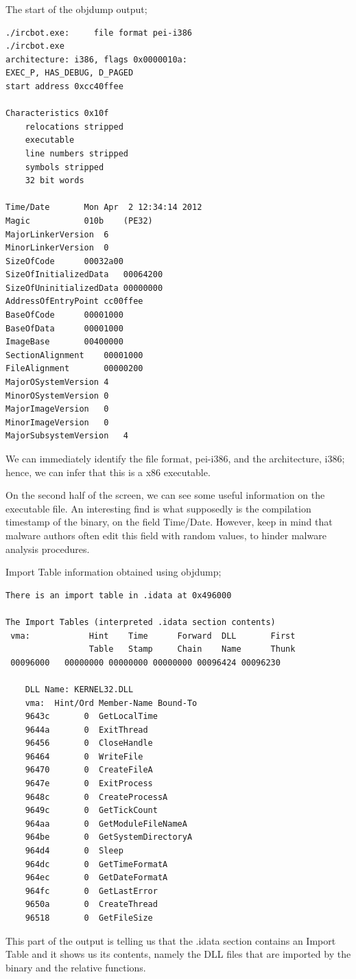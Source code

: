 \documentclass[]{project_plan}
\begin{document}
The start of the objdump output;
\begin{lstlisting}[basicstyle=\tiny]
./ircbot.exe:     file format pei-i386
./ircbot.exe
architecture: i386, flags 0x0000010a:
EXEC_P, HAS_DEBUG, D_PAGED
start address 0xcc40ffee

Characteristics 0x10f
	relocations stripped
	executable
	line numbers stripped
	symbols stripped
	32 bit words

Time/Date		Mon Apr  2 12:34:14 2012
Magic			010b	(PE32)
MajorLinkerVersion	6
MinorLinkerVersion	0
SizeOfCode		00032a00
SizeOfInitializedData	00064200
SizeOfUninitializedData	00000000
AddressOfEntryPoint	cc00ffee
BaseOfCode		00001000
BaseOfData		00001000
ImageBase		00400000
SectionAlignment	00001000
FileAlignment		00000200
MajorOSystemVersion	4
MinorOSystemVersion	0
MajorImageVersion	0
MinorImageVersion	0
MajorSubsystemVersion	4
\end{lstlisting}

We can immediately identify the file format, pei-i386, and
the architecture, i386; hence, we can infer that this is a x86 executable.

On the
second half of the screen, we can see some useful information on the executable
file. An interesting find is what supposedly is the compilation timestamp of the
binary, on the field Time/Date. However, keep in mind that malware authors
often edit this field with random values, to hinder malware analysis procedures.

Import Table information obtained using objdump;
\begin{lstlisting}[basicstyle=\tiny]
There is an import table in .idata at 0x496000

The Import Tables (interpreted .idata section contents)
 vma:            Hint    Time      Forward  DLL       First
                 Table   Stamp     Chain    Name      Thunk
 00096000	00000000 00000000 00000000 00096424 00096230

	DLL Name: KERNEL32.DLL
	vma:  Hint/Ord Member-Name Bound-To
	9643c	    0  GetLocalTime
	9644a	    0  ExitThread
	96456	    0  CloseHandle
	96464	    0  WriteFile
	96470	    0  CreateFileA
	9647e	    0  ExitProcess
	9648c	    0  CreateProcessA
	9649c	    0  GetTickCount
	964aa	    0  GetModuleFileNameA
	964be	    0  GetSystemDirectoryA
	964d4	    0  Sleep
	964dc	    0  GetTimeFormatA
	964ec	    0  GetDateFormatA
	964fc	    0  GetLastError
	9650a	    0  CreateThread
	96518	    0  GetFileSize
\end{lstlisting}

This part of the output is telling us that the .idata section contains
an Import Table and it shows us its contents, namely the DLL files that are
imported by the binary and the relative functions.
\end{document}
